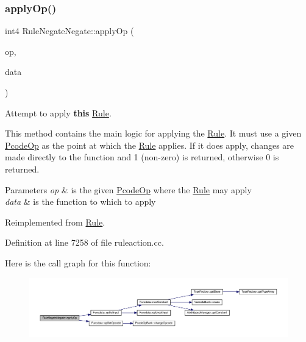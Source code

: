 \subsubsection{\texorpdfstring{applyOp()}{applyOp()}}
{\footnotesize\ttfamily int4 Rule\+Negate\+Negate\+::apply\+Op (\begin{DoxyParamCaption}\item[{\mbox{\hyperlink{class_pcode_op}{Pcode\+Op}} $\ast$}]{op,  }\item[{\mbox{\hyperlink{class_funcdata}{Funcdata}} \&}]{data }\end{DoxyParamCaption})\hspace{0.3cm}{\ttfamily [virtual]}}



Attempt to apply {\bfseries{this}} \mbox{\hyperlink{class_rule}{Rule}}. 

This method contains the main logic for applying the \mbox{\hyperlink{class_rule}{Rule}}. It must use a given \mbox{\hyperlink{class_pcode_op}{Pcode\+Op}} as the point at which the \mbox{\hyperlink{class_rule}{Rule}} applies. If it does apply, changes are made directly to the function and 1 (non-\/zero) is returned, otherwise 0 is returned. 
\begin{DoxyParams}{Parameters}
{\em op} & is the given \mbox{\hyperlink{class_pcode_op}{Pcode\+Op}} where the \mbox{\hyperlink{class_rule}{Rule}} may apply \\
\hline
{\em data} & is the function to which to apply \\
\hline
\end{DoxyParams}


Reimplemented from \mbox{\hyperlink{class_rule_a4e3e61f066670175009f60fb9dc60848}{Rule}}.



Definition at line 7258 of file ruleaction.\+cc.

Here is the call graph for this function\+:
\nopagebreak
\begin{figure}[H]
\begin{center}
\leavevmode
\includegraphics[width=350pt]{class_rule_negate_negate_a02dccbffcee07b90e8a7f6aab7bf1ccf_cgraph}
\end{center}
\end{figure}
\mbox{\label{class_rule_negate_negate_a50298fc906e6a8335e63ce3c4f65f6e7}} 
